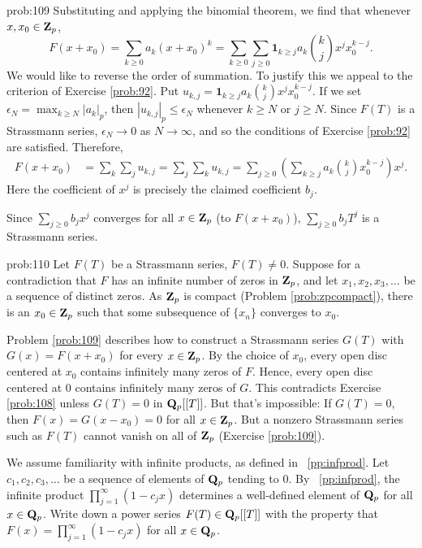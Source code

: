 \begin{sol}{prob:109} Substituting and applying the binomial theorem, we find that whenever $x,x_0 \in \mathbf{Z}_p$,
\[ F(x+x_0) =  \sum_{k\ge 0} a_k(x+x_0)^k = \sum_{k \ge 0} \sum_{j \ge 0} \mathbf{1}_{k\ge j} a_k \binom{k}{j} x^j x_0^{k-j}. \]
We would like to reverse the order of summation. To justify this we appeal to the criterion of Exercise \ref{prob:92}. Put $u_{k,j} = \mathbf{1}_{k\ge j} a_k \binom{k}{j} x^j x_0^{k-j}$. If we set $\epsilon_{N} = \max_{k\ge N} |a_k|_p$, then $|u_{k,j}|_p \le \epsilon_{N}$ whenever $k\ge N$ or $j \ge N$. Since $F(T)$ is a Strassmann series, $\epsilon_N\to 0$ as $N\to\infty$, and so the conditions of Exercise \ref{prob:92} are satisfied. Therefore,
\begin{align*} F(x+x_0) &= \sum_{k} \sum_{j} u_{k,j} = \sum_{j} \sum_{k} u_{k,j} = \sum_{j\ge 0} \left(\sum_{k\ge j} a_k \binom{k}{j} x_0^{k-j}\right)x^j.
\end{align*}
Here the coefficient of $x^j$ is precisely the claimed coefficient $b_j$.

Since $\sum_{j\ge 0} b_j x^j$ converges for all $x \in \mathbf{Z}_p$ (to $F(x+x_0)$), $\sum_{j\ge 0} b_j T^j$ is a Strassmann series.
\end{sol}

\begin{sol}{prob:110} Let $F(T)$ be a Strassmann series, $F(T) \ne 0$. Suppose for a contradiction that $F$ has an infinite number of zeros in $\mathbf{Z}_p$, and let $x_1, x_2, x_3,\dots$ be a sequence of distinct zeros. As $\mathbf{Z}_p$ is compact (Problem \ref{prob:zpcompact}), there is an $x_0 \in \mathbf{Z}_p$ such that some subsequence of $\{x_n\}$ converges to $x_0$.

Problem \ref{prob:109} describes how to construct a Strassmann series $G(T)$ with $G(x) = F(x+x_0)$ for every $x \in \mathbf{Z}_p$. By the choice of $x_0$, every open disc centered at $x_0$ contains infinitely many zeros of $F$. Hence, every open disc centered at $0$ contains infinitely many zeros of $G$. This contradicts Exercise \ref{prob:108} unless $G(T)=0$ in $\mathbf{Q}_p[[T]]$. But that's impossible: If $G(T) = 0$, then $F(x) = G(x-x_0)=0$ for all $x \in \mathbf{Z}_p$. But a nonzero Strassmann series such as $F(T)$ cannot vanish on all of $\mathbf{Z}_p$ (Exercise \ref{prob:109}).
\end{sol}



\begin{challenge}\label{pp:entireproduct} We assume familiarity with  infinite products, as defined in \pp~\ref{pp:infprod}. Let $c_1, c_2, c_3, \dots$ be a sequence of elements of $\mathbf{Q}_p$ tending to $0$. By \pp~\ref{pp:infprod}, the infinite product $\prod_{j=1}^{\infty} (1-c_j x)$ determines a well-defined element of $\mathbf{Q}_p$ for all $x \in \mathbf{Q}_p$. Write down a power series $F(T) \in \mathbf{Q}_p[[T]]$ with the property that $F(x) = \prod_{j=1}^{\infty} (1-c_j x)$ for all $x \in \mathbf{Q}_p$. 
\end{challenge}

